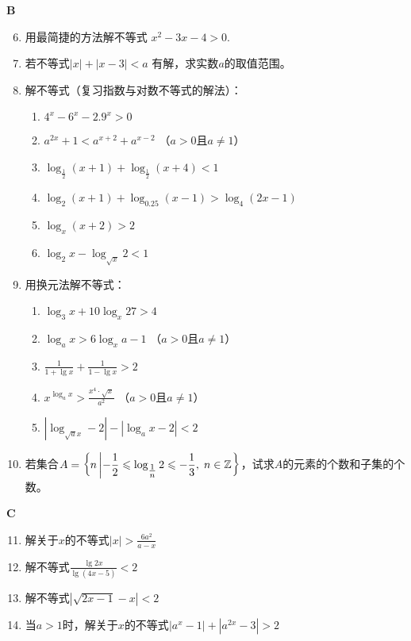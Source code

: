 \begin{center}
\bfseries B
\end{center}

\begin{enumerate}
\setcounter{enumi}{5}    
\item 用最简捷的方法解不等式
$x^2-3x-4>0$.
\item 若不等式$|x|+|x-3|<a$
有解，求实数$a$的取值范围。
\item 解不等式（复习指数与对数不等式的解法）：
\begin{enumerate}[(1)]
    \item $4^x-6^x-2.9^x>0$
    \item $a^{2x}+1<a^{x+2}+a^{x-2}$ （$a>0$且$a\ne 1$）
    \item $\log_{\tfrac{1}{2}}(x+1)+\log_{\tfrac{1}{2}}(x+4)<1$
    \item $\log_2(x+1)+\log_{0.25}(x-1)>\log_4(2x-1)$
    \item $\log_x(x+2)>2$
    \item $\log_2 x-\log_{\sqrt{x}}2<1$
\end{enumerate}


\item 用换元法解不等式：
\begin{enumerate}[(1)]
    \item $\log_3 x+10\log_x 27 >4$
    \item $\log_a x>6\log_x a-1$ （$a>0$且$a\ne 1$）
    \item $\frac{1}{1+\lg x}+\frac{1}{1-\lg x}>2$
    \item $x^{\log_a x}>\frac{x^4\cdot \sqrt{x}}{a^2}$ （$a>0$且$a\ne 1$）
    \item $\left|\log_{\sqrt{a}x}-2\right|-\left|\log_a x-2\right|<2$
\end{enumerate}

\item 若集合$A=\left\{n\left|-\dfrac{1}{2}\leqslant \log_{\tfrac{1}{n}}2\leqslant -\dfrac{1}{3},\; n\in\mathbb{Z} \right. \right\}$，试求$A$的元素的个数和子集的个数。
\end{enumerate}

\begin{center}
    \bfseries C
\end{center}
\begin{enumerate}
  \setcounter{enumi}{10}  
  \item  解关于$x$的不等式$|x|>\frac{6a^2}{a-x}$
  \item 解不等式$\frac{\lg 2x}{\lg(4x-5)}<2$
  \item 解不等式$|\sqrt{2x-1}-x|<2$
  \item 当$a>1$时，解关于$x$的不等式$|a^x-1|+|a^{2x}-3|>2$
\end{enumerate}


